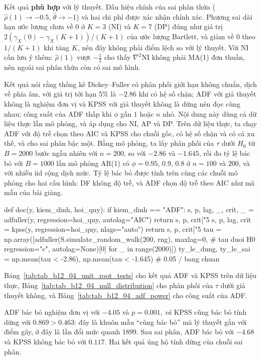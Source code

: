  Kết quả \textbf{phù hợp} với lý thuyết. Dấu hiệu chính của sai phân thừa ($\hat\rho(1)\to-0.5$, $\hat\theta\to-1$) và hai chi phí được xác nhận chính xác. Phương sai dài hạn ước lượng chưa về $0$ ở $K=3$ (NI) và $K=7$ (DP) đúng như giá trị $2(\gamma_X(0)-\gamma_X(K+1))/(K+1)$ của ước lượng Bartlett, và giảm về $0$ theo $1/(K+1)$ khi tăng $K$, nên đây không phải điểm lệch so với lý thuyết. Với NI cần lưu ý thêm: $\hat\rho(1)$ vượt $-\tfrac12$ cho thấy $\nabla^2$NI không phải MA(1) đơn thuần, nên ngoài sai phân thừa còn có sai mô hình.

 Kết quả  nói rằng thống kê Dickey--Fuller có phân phối giới hạn không chuẩn, dịch về phía âm, với giá trị tới hạn 5\% là $-2.86$ khi có hệ số chặn; ADF với giả thuyết không là nghiệm đơn vị và KPSS với giả thuyết không là dừng nên đọc cùng nhau; công suất của ADF thấp khi $\phi$ gần $1$ hoặc $n$ nhỏ.
 Nội dung này dùng cả dữ liệu thực lẫn mô phỏng, và áp dụng cho NI, AP và DP. Trên dữ liệu thực, ta chạy ADF với độ trễ chọn theo AIC và KPSS cho chuỗi gốc, có hệ số chặn và có cả xu thế, và cho sai phân bậc một. Bằng mô phỏng, ta lấy phân phối của $\tau$ dưới $H_0$ từ $B=2000$ bước ngẫu nhiên với $n=200$, so với $-2.86$ và $-1.645$, rồi đo tỷ lệ bác bỏ với $B=1000$ lần mô phỏng AR(1) có $\phi=0.95,\,0.9,\,0.8$ ở $n=100$ và $200$, và với nhiễu iid cộng dịch mức. Tỷ lệ bác bỏ được tính trên cùng các chuỗi mô phỏng cho hai cấu hình: DF không độ trễ, và ADF chọn độ trễ theo AIC như mã mẫu của bài giảng.
\begin{codeblock}
def doc(y, kiem_dinh, hoi_quy):
    if kiem_dinh == "ADF":
        s, p, lag, _, crit, _ = adfuller(y, regression=hoi_quy, autolag="AIC")
        return s, p, crit["5%
    s, p, lag, crit = kpss(y, regression=hoi_quy, nlags="auto")
    return s, p, crit["5%
tau = np.array([adfuller(S.simulate_random_walk(200, rng), maxlag=0,       # tau duoi H0
                         regression="c", autolag=None)[0] for _ in range(2000)])
ty_le_dung, ty_le_sai = np.mean(tau < -2.86), np.mean(tau < -1.645)       # 0.05 / bang chuan
\end{codeblock}
 Bảng~\ref{tab:tab_b12_04_unit_root_tests} cho kết quả ADF và KPSS trên dữ liệu thực, Bảng~\ref{tab:tab_b12_04_null_distribution} cho phân phối của $\tau$ dưới giả thuyết không, và Bảng~\ref{tab:tab_b12_04_adf_power} cho công suất của ADF.



 ADF bác bỏ nghiệm đơn vị với $-4.05$ và $p=0.001$, \emph{và} KPSS cũng bác bỏ tính dừng với $0.869>0.463$: đây là khuôn mẫu ``cùng bác bỏ'' mà lý thuyết gắn với điểm gãy, ở đây là lần đổi mức quanh 1899. Sau sai phân, ADF bác bỏ với $-4.68$ và KPSS không bác bỏ với $0.117$. Hai kết quả ủng hộ tính dừng của chuỗi sai phân.


